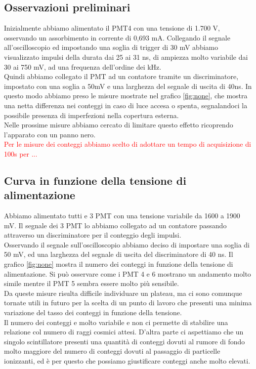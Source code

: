 \documentclass[a4paper,10pt]{article}
\newcommand{\note}[1]{\textcolor{red}{#1}}
\begin{document}
\subsection{Osservazioni preliminari}
Inizialmente abbiamo alimentato il PMT4 con una tensione di 1.700 V, osservando un assorbimento in corrente di 0,693 mA. Collegando il segnale all'oscilloscopio ed impostando una soglia di trigger di 30 mV abbiamo visualizzato impulsi della durata dai 25 ai 31 ns, di ampiezza molto variabile dai 30 ai 750 mV, ad una frequenza dell'ordine dei kHz.
\\
Quindi abbiamo collegato il PMT ad un contatore tramite un discriminatore, impostato con una soglia a 50mV e una larghezza del segnale di uscita di 40ns. In questo modo abbiamo preso le misure mostrate nel grafico \ref{fig:none}, che mostra una netta differenza nei conteggi in caso di luce accesa o spenta, segnalandoci la possibile presenza di imperfezioni nella copertura esterna.
\\
Nelle prossime misure abbiamo cercato di limitare questo effetto ricoprendo l'apparato con un panno nero.
\\
\note{Per le misure dei conteggi abbiamo scelto di adottare un tempo di acquisizione di 100s per ...}
\subsection{Curva in funzione della tensione di alimentazione}
Abbiamo alimentato tutti e 3 PMT con una tensione variabile da 1600 a 1900 mV. Il segnale dei 3 PMT lo abbiamo collegato ad un contatore passando attraverso un discriminatore per il conteggio degli impulsi.\\
Osservando il segnale sull'oscilloscopio abbiamo deciso di impostare una soglia di 50 mV, ed una larghezza del segnale di uscita del discriminatore di 40 ns. 
Il grafico \ref{fig:none} mostra il numero dei conteggi in funzione della tensione di alimentazione. Si può osservare come i PMT 4 e 6 mostrano un andamento molto simile mentre il PMT 5 sembra essere molto più sensibile.
\\
Da queste misure risulta difficile individuare un plateau, ma ci sono comunque tornate utili in futuro per la scelta di un punto di lavoro che presenti una minima variazione del tasso dei conteggi in funzione della tensione.
\\
Il numero dei conteggi e molto variabile e non ci permette di stabilire una relazione col numero di raggi cosmici attesi. D'altra parte ci aspettiamo che un singolo scintillatore presenti una quantità di conteggi dovuti al rumore di fondo molto maggiore del numero di conteggi dovuti al passaggio di particelle ionizzanti, ed è per questo che possiamo giustificare conteggi anche molto elevati.
\end{document}

